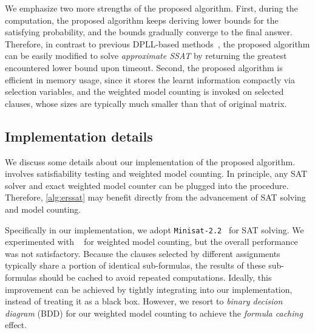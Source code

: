 We emphasize two more strengths of the proposed algorithm.
First, during the computation,
the proposed algorithm keeps deriving lower bounds for the satisfying probability,
and the bounds gradually converge to the final answer.
Therefore, in contrast to previous DPLL-based methods~\cite{Majercik1998,Majercik2003,Majercik2005},
the proposed algorithm can be easily modified to solve \textit{approximate SSAT} by returning the greatest encountered lower bound upon timeout.
Second, the proposed algorithm is efficient in memory usage,
since it stores the learnt information compactly via selection variables,
and the weighted model counting is invoked on selected clauses,
whose sizes are typically much smaller than that of original matrix.


\subsection{Implementation details}
We discuss some details about our implementation of the proposed algorithm.
 involves satisfiability testing and weighted model counting.
In principle, any SAT solver and exact weighted model counter can be plugged into the procedure.
Therefore, \cref{alg:erssat} may benefit directly from the advancement of SAT solving and model counting.

Specifically in our implementation,
we adopt \texttt{Minisat-2.2}~\cite{Een2003Solver} for SAT solving.
We experimented with \cachet~\cite{Sang2004,Sang2005ModelCounting} for weighted model counting,
but the overall performance was not satisfactory.
Because the clauses selected by different assignments typically share a portion of identical sub-formulas,
the results of these sub-formulas should be cached to avoid repeated computations.
Ideally, this improvement can be achieved by tightly integrating \cachet into our implementation,
instead of treating it as a black box.
However, we resort to \textit{binary decision diagram} (BDD) for our weighted model counting to achieve the \textit{formula caching} effect.

